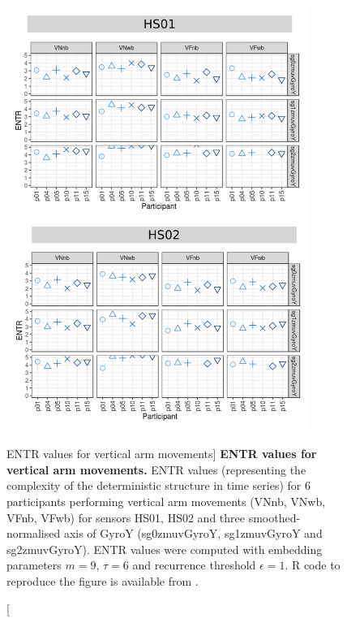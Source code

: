 \begin{figure}
\centering
\includegraphics[width=0.88\textwidth]{rqa_entr_V_w500}
    \caption
	[ENTR values for vertical arm movements]{
	{\bf ENTR values for vertical arm movements.}	
	ENTR values (representing the complexity of the deterministic 
	structure in time series) for 
	6 participants performing vertical arm movements (VNnb, VNwb, VFnb, VFwb)
	for sensors HS01, HS02 and three smoothed-normalised axis 
	of GyroY (sg0zmuvGyroY, sg1zmuvGyroY and sg2zmuvGyroY).
	ENTR values were computed with 
	embedding parameters $m=9$, $\tau=6$ and recurrence threshold
	$\epsilon=1$.
	R code to reproduce the figure is available from \cite{hwum2018}.
        }
    \label{fig:rqa_entr_V}
\end{figure}





